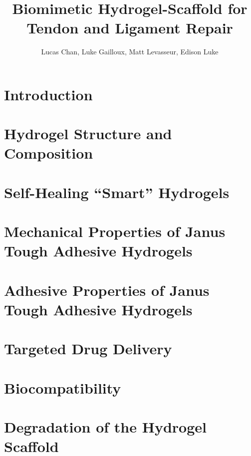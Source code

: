 \documentclass[
    letterpaper,
    10pt,
    unnumberedsections,
    twoside
]{LTJournalArticle}
\title{Biomimetic Hydrogel-Scaffold for Tendon and Ligament Repair}
\author{Lucas Chan, Luke Gailloux, Matt Levasseur, Edison Luke}
\begin{document}
    \maketitle 

    \section{Introduction}

    

    \section{Hydrogel Structure and Composition}

    

    \section{Self-Healing ``Smart'' Hydrogels}

    

    

    \section{Mechanical Properties of Janus Tough Adhesive Hydrogels}

    

    \section{Adhesive Properties of Janus Tough Adhesive Hydrogels}

    

    \section{Targeted Drug Delivery}

    

    \section{Biocompatibility}

    

    \section{Degradation of the Hydrogel Scaffold}

    


    

    \onecolumn
    \printbibliography
\end{document}
